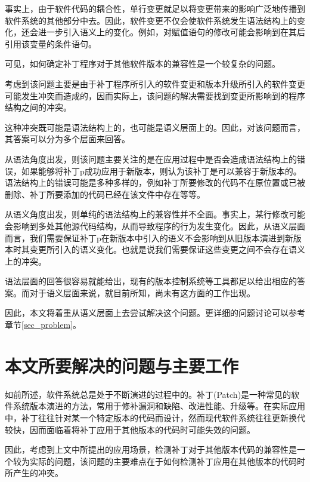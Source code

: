 事实上，由于软件代码的耦合性，单行变更就足以将变更带来的影响广泛地传播到软件系统的其他部分中去\cite{wilkerson2012software,tao2012software}。因此，软件变更不仅会使软件系统发生语法结构上的变化，还会进一步引入语义上的变化。例如，对赋值语句的修改可能会影响到在其后引用该变量的条件语句。

可见，如何确定补丁程序对于其他软件版本的兼容性是一个较复杂的问题。

考虑到该问题主要是由于补丁程序所引入的软件变更和版本升级所引入的软件变更可能发生冲突而造成的，因而实际上，该问题的解决需要找到变更所影响到的程序结构之间的冲突。

这种冲突既可能是语法结构上的，也可能是语义层面上的。因此，对该问题而言，其答案可以分为多个层面来回答。

从语法角度出发，则该问题主要关注的是在应用过程中是否会造成语法结构上的错误，如果能够将补丁p成功应用于新版本，则认为该补丁是可以兼容于新版本的。语法结构上的错误可能是多种多样的，例如补丁所要修改的代码不在原位置或已被删除、补丁所要添加的代码已经在该文件中存在等等。

从语义角度出发，则单纯的语法结构上的兼容性并不全面。事实上，某行修改可能会影响到多处其他源代码结构，从而导致程序的行为发生变化。因此，从语义层面而言，我们需要保证补丁p在新版本中引入的语义不会影响到从旧版本演进到新版本时其变更所引入的语义变化。也就是说我们需要保证这些变更之间不会存在语义上的冲突。

语法层面的回答很容易就能给出，现有的版本控制系统等工具都足以给出相应的答案。而对于语义层面来说，就目前所知，尚未有这方面的工作出现。

因此，本文将着重从语义层面上去尝试解决这个问题。更详细的问题讨论可以参考章节\ref {sec_problem}。


\section{本文所要解决的问题与主要工作}

如前所述，软件系统总是处于不断演进的过程中的。补丁(Patch)是一种常见的软件系统版本演进的方法，常用于修补漏洞和缺陷、改进性能、升级等。在实际应用中，补丁往往针对某一个特定版本的代码而设计，然而现代软件系统往往更新换代较快，因而面临着将补丁应用于其他版本的代码时可能失效的问题。


因此，考虑到上文中所提出的应用场景，检测补丁对于其他版本代码的兼容性是一个较为实际的问题，该问题的主要难点在于如何检测补丁应用在其他版本的代码时所产生的冲突。

